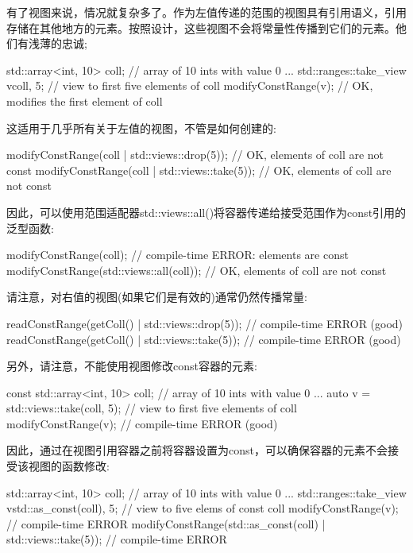 有了视图来说，情况就复杂多了。作为左值传递的范围的视图具有引用语义，引用存储在其他地方的元素。按照设计，这些视图不会将常量性传播到它们的元素。他们有浅薄的忠诚;

\begin{cpp}
std::array<int, 10> coll{}; // array of 10 ints with value 0
...
std::ranges::take_view v{coll, 5}; // view to first five elements of coll
modifyConstRange(v); // OK, modifies the first element of coll
\end{cpp}

这适用于几乎所有关于左值的视图，不管是如何创建的:

\begin{cpp}
modifyConstRange(coll | std::views::drop(5)); // OK, elements of coll are not const
modifyConstRange(coll | std::views::take(5)); // OK, elements of coll are not const
\end{cpp}

因此，可以使用范围适配器std::views::all()将容器传递给接受范围作为const引用的泛型函数:

\begin{cpp}
modifyConstRange(coll); // compile-time ERROR: elements are const
modifyConstRange(std::views::all(coll)); // OK, elements of coll are not const
\end{cpp}

请注意，对右值的视图(如果它们是有效的)通常仍然传播常量:

\begin{cpp}
readConstRange(getColl() | std::views::drop(5)); // compile-time ERROR (good)
readConstRange(getColl() | std::views::take(5)); // compile-time ERROR (good)
\end{cpp}

另外，请注意，不能使用视图修改const容器的元素:

\begin{cpp}
const std::array<int, 10> coll{}; // array of 10 ints with value 0
...
auto v = std::views::take(coll, 5); // view to first five elements of coll
modifyConstRange(v); // compile-time ERROR (good)
\end{cpp}

因此，通过在视图引用容器之前将容器设置为const，可以确保容器的元素不会接受该视图的函数修改:

\begin{cpp}
std::array<int, 10> coll{}; // array of 10 ints with value 0
...
std::ranges::take_view v{std::as_const(coll), 5}; // view to five elems of const coll
modifyConstRange(v); // compile-time ERROR
modifyConstRange(std::as_const(coll) | std::views::take(5)); // compile-time ERROR
\end{cpp}

